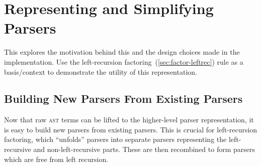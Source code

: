 \documentclass[../../../main.tex]{subfiles}
\begin{document}
\section{Representing and Simplifying Parsers}\label{sec:parser-representation}



This  explores the motivation behind this and the design choices made in the implementation.
Use the left-recursion factoring~(\cref{sec:factor-leftrec}) rule as a basis/context to demonstrate the utility of this representation.


\subsection{Building New Parsers From Existing Parsers}
Now that raw \textsc{ast} terms can be lifted to the higher-level parser representation, it is easy to build new parsers from existing parsers.
This is crucial for left-recursion factoring, which ``unfolds'' parsers into separate parsers representing the left-recursive and non-left-recursive parts.
These are then recombined to form parsers which are free from left recursion.
\end{document}
